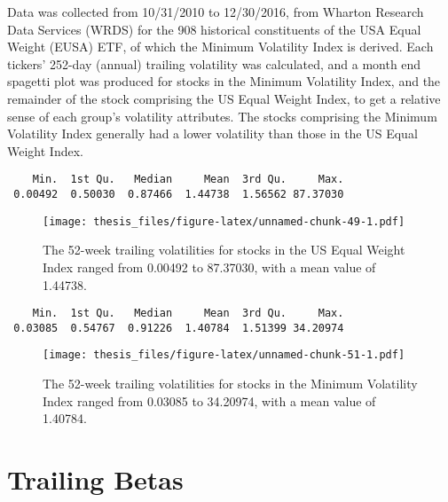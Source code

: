 \documentclass[12pt,twoside]{reedthesis}
\theoremstyle{definition}
\theoremstyle{definition}
\theoremstyle{definition}
\theoremstyle{remark}
\begin{document}
Data was collected from 10/31/2010 to 12/30/2016, from Wharton Research
Data Services (WRDS) for the 908 historical constituents of the USA
Equal Weight (EUSA) ETF, of which the Minimum Volatility Index is
derived. Each tickers' 252-day (annual) trailing volatility was
calculated, and a month end spagetti plot was produced for stocks in the
Minimum Volatility Index, and the remainder of the stock comprising the
US Equal Weight Index, to get a relative sense of each group's
volatility attributes. The stocks comprising the Minimum Volatility
Index generally had a lower volatility than those in the US Equal Weight
Index.
\begin{verbatim}
    Min.  1st Qu.   Median     Mean  3rd Qu.     Max. 
 0.00492  0.50030  0.87466  1.44738  1.56562 87.37030 
\end{verbatim}
\begin{figure}[htbp]
\centering
\texttt{[image: thesis\_files/figure-latex/unnamed-chunk-49-1.pdf]}
\caption{\label{fig:unnamed-chunk-49}The 52-week trailing volatilities for
stocks in the US Equal Weight Index ranged from 0.00492 to 87.37030,
with a mean value of 1.44738.}
\end{figure}
\begin{verbatim}
    Min.  1st Qu.   Median     Mean  3rd Qu.     Max. 
 0.03085  0.54767  0.91226  1.40784  1.51399 34.20974 
\end{verbatim}
\begin{figure}[htbp]
\centering
\texttt{[image: thesis\_files/figure-latex/unnamed-chunk-51-1.pdf]}
\caption{\label{fig:unnamed-chunk-51}The 52-week trailing volatilities for
stocks in the Minimum Volatility Index ranged from 0.03085 to 34.20974,
with a mean value of 1.40784.}
\end{figure}
\section{Trailing Betas}\label{trailing-betas}
\end{document}

